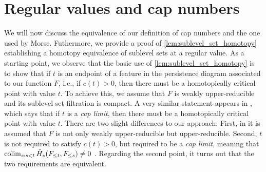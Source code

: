 
\section{Regular values and cap numbers} \label{s:caps}
We will now discuss the equivalence of our definition of cap numbers and the one used by Morse.
Futhermore, we provide a proof of \cref{lem:sublevel_set_homotopy} establishing a homotopy equivalence of sublevel sets at a regular value.
As a starting point, we observe that the basic use of \cref{lem:sublevel_set_homotopy} is to show that if $t$ is an endpoint of a feature in the persistence diagram associated to our function $F$, i.e., if $c(t) > 0$, then there must be a homotopically critical point with value $t$.
To achieve this, we assume that $F$ is weakly upper-reducible and its sublevel set filtration is compact.
A very similar statement appears in \cite[Theorem 8.1]{Morse.1938}, which says that if $t$ is a \emph{cap limit}, then there must be a homotopically critical point with value $t$.
There are two slight differences to our approach: 
First, in \cite[Theorem 8.1]{Morse.1938} it is assumed that $F$ is not only weakly upper-reducible but upper-reducible.
Second, $t$ is not required to satisfy $c(t) > 0$, but required to be a \emph{cap limit}, meaning that $\operatorname*{colim}_{s: s < t} \check{H}_*(F_{\leq t}, F_{\leq s}) \neq 0$ \cite[p.~12]{Morse.1938}.
Regarding the second point, it turns out that the two requirements are equivalent.

